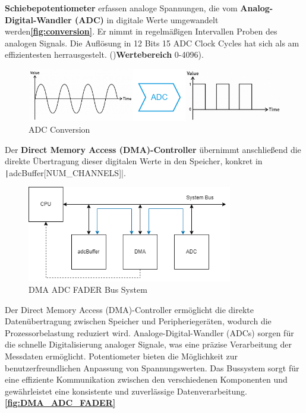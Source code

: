 \textbf{Schiebepotentiometer} erfassen analoge Spannungen, die vom \textbf{Analog-Digital-Wandler (ADC)} in digitale Werte umgewandelt werden\textbf{\autoref{fig:conversion}}. Er nimmt in regelmäßigen Intervallen Proben des analogen Signals. Die Auflösung in 12 Bits 15 ADC Clock Cycles hat sich als am effizientesten herrausgestelt. ()\textbf{Wertebereich} 0-4096).

\begin{figure}[H]
	\centering
	\includegraphics[width=1.0\textwidth]{images/08_durchfuehrung/interface/Conversion.drawio.png}
	\caption{ADC Conversion}
	\label{fig:conversion}
\end{figure}

Der \textbf{Direct Memory Access (DMA)-Controller} übernimmt anschließend die direkte Übertragung dieser digitalen Werte in den Speicher, konkret in  \texttt|adcBuffer[NUM_CHANNELS]|.

\begin{figure}[H]
\centering
\includegraphics[width=0.8\textwidth]{images/08_durchfuehrung/interface/DMA_ADC_MEM.drawio.png}
\caption{DMA ADC FADER Bus System}
\label{fig:DMA_ADC_FADER}
\end{figure}

Der Direct Memory Access (DMA)-Controller ermöglicht die direkte Datenübertragung zwischen Speicher und Peripheriegeräten, wodurch die Prozessorbelastung reduziert wird. Analoge-Digital-Wandler (ADCs) sorgen für die schnelle Digitalisierung analoger Signale, was eine präzise Verarbeitung der Messdaten ermöglicht. Potentiometer bieten die Möglichkeit zur benutzerfreundlichen Anpassung von Spannungswerten. Das Bussystem sorgt für eine effiziente Kommunikation zwischen den verschiedenen Komponenten und gewährleistet eine konsistente und zuverlässige Datenverarbeitung. \textbf{\autoref{fig:DMA_ADC_FADER}} \\

